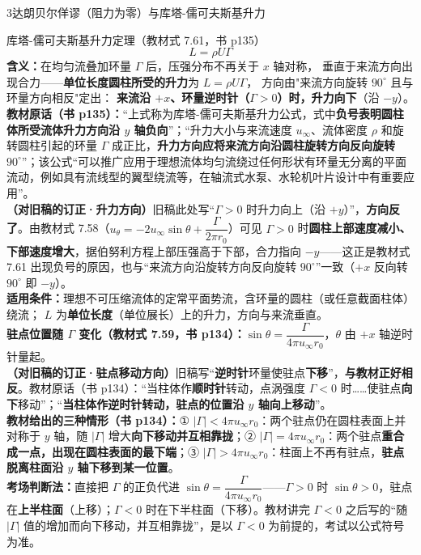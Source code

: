 \begin{kaodian}{3}{达朗贝尔佯谬（阻力为零）与库塔-儒可夫斯基升力}
\begin{gongshi}{库塔-儒可夫斯基升力定理（教材式 7.61，书 p135）}
\[ L=\rho U\Gamma \]
\textbf{含义：}在均匀流叠加环量 $\Gamma$ 后，压强分布不再关于 $x$ 轴对称，
垂直于来流方向出现合力——\textbf{单位长度圆柱所受的升力}为 $L=\rho U\Gamma$，
方向由"来流方向旋转 $90^\circ$ 且与环量方向相反"定出：
\textbf{来流沿 $+x$、环量逆时针（$\Gamma>0$）时，升力向下}（沿 $-y$）。\\
\textbf{教材原话（书 p135）：}“上式称为库塔-儒可夫斯基升力公式，式中\textbf{负号表明圆柱体所受流体升力方向沿 $y$ 轴负向}”；“升力大小与来流速度 $u_\infty$、流体密度 $\rho$ 和旋转圆柱引起的环量 $\Gamma$ 成正比，\textbf{升力方向应将来流方向沿圆柱旋转方向反向旋转 $90^\circ$}”；该公式“可以推广应用于理想流体均匀流绕过任何形状有环量无分离的平面流动，例如具有流线型的翼型绕流等，在轴流式水泵、水轮机叶片设计中有重要应用”。\\
\textbf{（对旧稿的订正·升力方向）}旧稿此处写“$\Gamma>0$ 时升力向上（沿 $+y$）”，\textbf{方向反了}。由教材式 7.58（$u_\theta=-2u_\infty\sin\theta+\dfrac{\Gamma}{2\pi r_0}$）可见 $\Gamma>0$ 时\textbf{圆柱上部速度减小、下部速度增大}，据伯努利方程上部压强高于下部，合力指向 $-y$——这正是教材式 7.61 出现负号的原因，也与“来流方向沿旋转方向反向旋转 $90^\circ$”一致（$+x$ 反向转 $90^\circ$ 即 $-y$）。\\
\textbf{适用条件：}理想不可压缩流体的定常平面势流，含环量的圆柱（或任意截面柱体）绕流；
$L$ 为\textbf{单位长度}（单位展长）上的升力，方向与来流垂直。\\
\textbf{驻点位置随 $\Gamma$ 变化（教材式 7.59，书 p134）：}$\sin\theta=\dfrac{\Gamma}{4\pi u_\infty r_0}$，$\theta$ 由 $+x$ 轴逆时针量起。\\
\textbf{（对旧稿的订正·驻点移动方向）}旧稿写“\textbf{逆时针}环量使驻点\textbf{下移}”，\textbf{与教材正好相反}。教材原话（书 p134）：“当柱体作\textbf{顺时针}转动，点涡强度 $\Gamma<0$ 时……使驻点\textbf{向下}移动”；“\textbf{当柱体作逆时针转动，驻点的位置沿 $y$ 轴向上移动}”。\\
\textbf{教材给出的三种情形（书 p134）：}① $|\Gamma|<4\pi u_\infty r_0$：两个驻点仍在圆柱表面上并对称于 $y$ 轴，随 $|\Gamma|$ 增大\textbf{向下移动并互相靠拢}；② $|\Gamma|=4\pi u_\infty r_0$：两个驻点\textbf{重合成一点，出现在圆柱表面的最下端}；③ $|\Gamma|>4\pi u_\infty r_0$：柱面上不再有驻点，\textbf{驻点脱离柱面沿 $y$ 轴下移到某一位置}。\\
\textbf{考场判断法：}直接把 $\Gamma$ 的正负代进 $\sin\theta=\dfrac{\Gamma}{4\pi u_\infty r_0}$——$\Gamma>0$ 时 $\sin\theta>0$，驻点在\textbf{上半柱面}（上移）；$\Gamma<0$ 时在下半柱面（下移）。教材讲完 $\Gamma<0$ 之后写的“随 $|\Gamma|$ 值的增加而向下移动，并互相靠拢”，是以 $\Gamma<0$ 为前提的，考试以公式符号为准。
\end{gongshi}


\end{kaodian}
